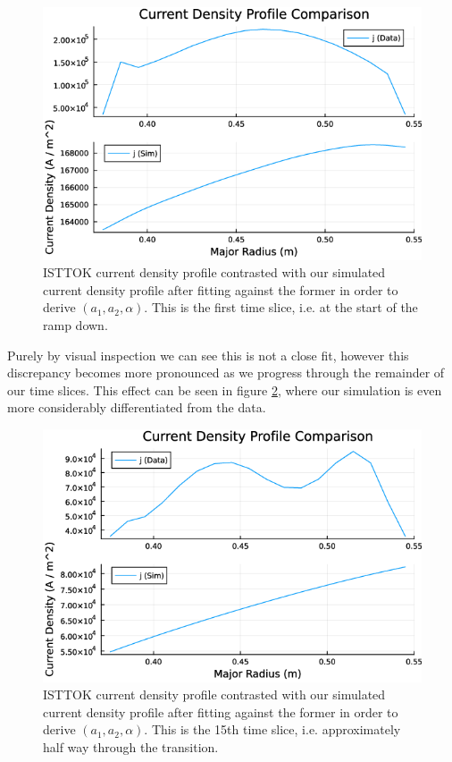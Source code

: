 \begin{figure}[h!]
    \centering
    \includegraphics[scale=0.7]{imgs/c5/comparison-current-0-unfiltered.png}
    \caption{ISTTOK current density profile contrasted with our simulated current density profile
    after fitting against the former in order to derive $(a_1, a_2, \alpha)$. This is the first 
    time slice, i.e. at the start of the ramp down.}
    \label{comparison-current-0-unfiltered}
\end{figure}
Purely by visual inspection we can see this is not a close fit, 
however this discrepancy becomes more pronounced as we progress through the remainder of our time slices. 
This effect can be seen in figure \ref{comparison-current-15-unfiltered}, where our simulation is 
even more considerably differentiated from the data.

\begin{figure}[h!]
    \centering
    \includegraphics[scale=0.7]{imgs/c5/comparison-current-15-unfiltered.png}
    \caption{ISTTOK current density profile contrasted with our simulated current density profile
    after fitting against the former in order to derive $(a_1, a_2, \alpha)$. This is the 15th 
    time slice, i.e. approximately half way through the transition.}
    \label{comparison-current-15-unfiltered}
\end{figure}

